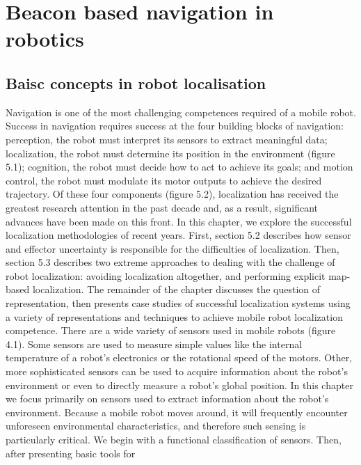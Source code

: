 \chapter{Beacon based navigation in robotics}

\section{Baisc concepts in robot localisation}
Navigation is one of the most challenging competences required of a mobile robot. Success
in navigation requires success at the four building blocks of navigation: perception, the
robot must interpret its sensors to extract meaningful data; localization, the robot must
determine its position in the environment (figure 5.1); cognition, the robot must decide how
to act to achieve its goals; and motion control, the robot must modulate its motor outputs to
achieve the desired trajectory.
Of these four components (figure 5.2), localization has received the greatest research
attention in the past decade and, as a result, significant advances have been made on this
front. In this chapter, we explore the successful localization methodologies of recent years.
First, section 5.2 describes how sensor and effector uncertainty is responsible for the 
difficulties of localization. Then, section 5.3 describes two extreme approaches to dealing with
the challenge of robot localization: avoiding localization altogether, and performing
explicit map-based localization. The remainder of the chapter discusses the question of
representation, then presents case studies of successful localization systems using a variety of
representations and techniques to achieve mobile robot localization competence.
There are a wide variety of sensors used in mobile robots (figure 4.1). Some sensors are
used to measure simple values like the internal temperature of a robot’s electronics or the
rotational speed of the motors. Other, more sophisticated sensors can be used to acquire
information about the robot’s environment or even to directly measure a robot’s global
position. In this chapter we focus primarily on sensors used to extract information about the
robot’s environment. Because a mobile robot moves around, it will frequently encounter
unforeseen environmental characteristics, and therefore such sensing is particularly critical.
We begin with a functional classification of sensors. Then, after presenting basic tools for
